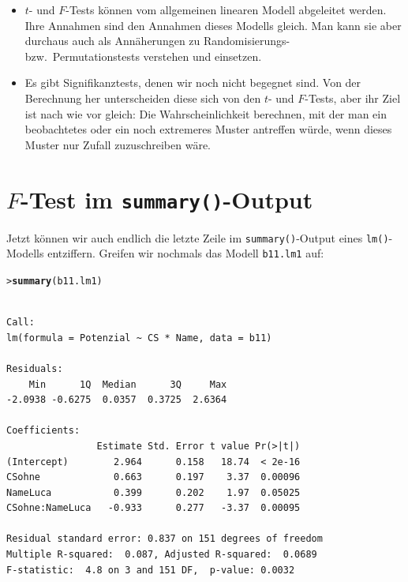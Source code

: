 \documentclass[oneside, 10pt]{book}\usepackage[]{graphicx}\usepackage[]{xcolor}
\makeatletter
\newcommand{\hlstd}[1]{\textcolor[rgb]{0.345,0.345,0.345}{#1}}%
\newcommand{\hlkwd}[1]{\textcolor[rgb]{0.737,0.353,0.396}{\textbf{#1}}}%
\newenvironment{kframe}{%
 \def\at@end@of@kframe{}%
 \ifinner\ifhmode%
  \def\at@end@of@kframe{\end{minipage}}%
  \begin{minipage}{\columnwidth}%
 \fi\fi%
 \def\FrameCommand##1{\hskip\@totalleftmargin \hskip-\fboxsep
 \colorbox{shadecolor}{##1}\hskip-\fboxsep
     \hskip-\linewidth \hskip-\@totalleftmargin \hskip\columnwidth}%
 \MakeFramed {\advance\hsize-\width
   \@totalleftmargin\z@ \linewidth\hsize
   \@setminipage}}%
 {\par\unskip\endMakeFramed%
 \at@end@of@kframe}
\newenvironment{knitrout}{}{} %
\makeatother
\begin{document}
\begin{itemize}
 \item $t$- und $F$-Tests können vom allgemeinen linearen Modell abgeleitet
 werden. Ihre Annahmen sind den Annahmen dieses Modells gleich. Man kann
 sie aber durchaus auch als Annäherungen zu Randomisierungs- bzw.\ Permutationstests
 verstehen und einsetzen.

 \item Es gibt Signifikanztests, denen wir noch nicht begegnet sind.
 Von der Berechnung her unterscheiden diese sich von den $t$- und $F$-Tests,
 aber ihr Ziel ist nach wie vor gleich: Die Wahrscheinlichkeit berechnen,
 mit der man ein beobachtetes oder ein noch extremeres Muster antreffen würde,
 wenn dieses Muster nur Zufall zuzuschreiben wäre.
\end{itemize}

\section{$F$-Test im \texttt{summary()}-Output}\label{sec:ftestsummary}
Jetzt können wir auch endlich die letzte Zeile
im \texttt{summary()}-Output eines \texttt{lm()}-Modells
entziffern. Greifen wir nochmals das Modell \texttt{b11.lm1} auf:
\begin{knitrout}
\color{fgcolor}\begin{kframe}
\begin{alltt}
\hlstd{> }\hlkwd{summary}\hlstd{(b11.lm1)}
\end{alltt}
\begin{verbatim}

Call:
lm(formula = Potenzial ~ CS * Name, data = b11)

Residuals:
    Min      1Q  Median      3Q     Max 
-2.0938 -0.6275  0.0357  0.3725  2.6364 

Coefficients:
                Estimate Std. Error t value Pr(>|t|)
(Intercept)        2.964      0.158   18.74  < 2e-16
CSohne             0.663      0.197    3.37  0.00096
NameLuca           0.399      0.202    1.97  0.05025
CSohne:NameLuca   -0.933      0.277   -3.37  0.00095

Residual standard error: 0.837 on 151 degrees of freedom
Multiple R-squared:  0.087,	Adjusted R-squared:  0.0689 
F-statistic:  4.8 on 3 and 151 DF,  p-value: 0.0032
\end{verbatim}
\end{kframe}
\end{knitrout}
\end{document}
